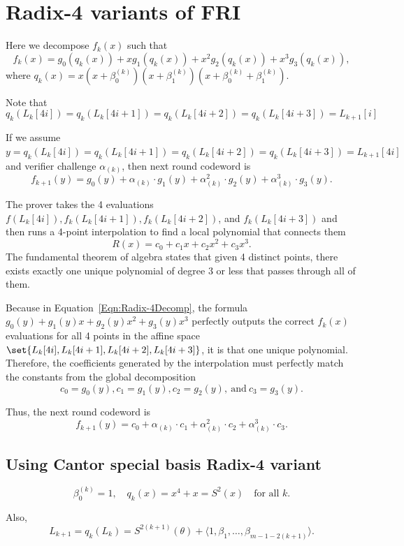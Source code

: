 \documentclass[11pt,runningheads]{llncs}
\begin{document}
\section{Radix-4 variants of FRI}
Here we decompose $f_k(x)$ such that
\begin{equation}\label{Eqn:Radix-4Decomp}
    f_{k}(x)= g_0(q_k(x))+ xg_1(q_k(x))+ x^2g_2(q_k(x))+ x^3g_3(q_k(x)) ,
\end{equation}
where $q_k(x)=x(x+\beta_{0}^{(k)})(x+\beta_{1}^{(k)})(x+\beta_{0}^{(k)}+\beta_{1}^{(k)})$.

Note that 
\[ q_k(L_{k}[4i])=q_k(L_{k}[4i+1])=q_k(L_{k}[4i+2])=q_k(L_{k}[4i+3])=L_{k+1}[i] \]

If we assume $y=q_k(L_{k}[4i])=q_k(L_{k}[4i+1])=q_k(L_{k}[4i+2])=q_k(L_{k}[4i+3])=L_{k+1}[4i]$ and verifier challenge $\alpha_{(k)}$, then next round codeword is
\[f_{k+1}(y)
= g_{0}(y)+\alpha_{(k)}\cdot g_{1}(y)+ \alpha_{(k)}^2 \cdot g_{2}(y)+ \alpha_{(k)}^3 \cdot g_{3}(y) . \]

The prover takes the 4 evaluations $f(L_{k}[4i]), f_k(L_{k}[4i+1]), f_k(L_{k}[4i+2])$, and $f_k(L_{k}[4i+3])$ and then runs a 4-point interpolation to find a local polynomial that connects them 
\[R(x) = c_0 + c_1 x + c_2 x^2 + c_3 x^3 .\]
The fundamental theorem of algebra states that given 4 distinct points, there exists exactly one unique polynomial of degree 3 or less that passes through all of them. 

Because in Equation~\ref{Eqn:Radix-4Decomp}, the formula $g_0(y) + g_1(y)x + g_2(y)x^2 + g_3(y)x^3$ perfectly outputs the correct $f_k(x)$ evaluations for all 4 points in the affine space $\set{L_{k}[4i], L_{k}[4i+1], L_{k}[4i+2],L_{k}[4i+3]}$, it is that one unique polynomial. Therefore, the coefficients generated by the interpolation must perfectly match the constants from the global decomposition
\[c_0 = g_0(y), c_1 = g_1(y), c_2 = g_2(y), ~\text{and}~ c_3 = g_3(y)  . \]

Thus, the next round codeword is
\[f_{k+1}(y)
= c_0+\alpha_{(k)}\cdot c_1+ \alpha_{(k)}^2 \cdot c_2+ \alpha_{(k)}^3 \cdot c_3 . \]


\subsection{Using Cantor special basis Radix-4 variant}

\[\beta_{0}^{(k)}=1, \quad q_{k}(x)=x^4+x=S^2(x) \quad \text{for all } k.\]

Also, 
\[L_{k+1}=q_{k}(L_{k})= S^{2(k+1)}(\theta)+ \langle 1,\beta_{1},\dots,\beta_{m-1-2(k+1)} \rangle .\]
\end{document}
